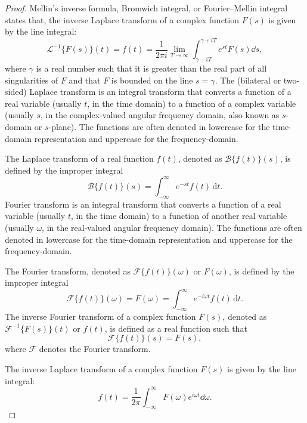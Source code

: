 \documentclass[a4paper,12pt]{report}
\begin{document}
\begin{proof}
Mellin's inverse formula, Bromwich integral, or Fourier–Mellin integral states that, the inverse Laplace transform of a complex function $F(s)$ is given by the line integral:
\[\mathcal{L}^{-1}\{F(s)\}(t)=f(t)=\frac{1}{2\pi i}\lim_{T\to\infty}\int_{\gamma-iT}^{\gamma+iT}e^{st}F(s)\dd{s},\]
where $\gamma$ is a real number such that it is greater than the real part of all singularities of $F$ and that $F$ is bounded on the line $s=\gamma$.
The (bilateral or two-sided) Laplace transform is an integral transform that converts a function of a real variable (usually $t$, in the time domain) to a function of a complex variable (usually $s$, in the complex-valued angular frequency domain, also known as $s$-domain or $s$-plane). The functions are often denoted in lowercase for the time-domain representation and uppercase for the frequency-domain.

The Laplace transform of a real function $f(t)$, denoted as $\mathcal{B}\{f(t)\}(s)$, is defined by the improper integral
\[\mathcal{B}\{f(t)\}(s) = \int_{-\infty}^{\infty} e^{-st} f(t)\,\mathrm{d}t.\]
Fourier transform is an integral transform that converts a function of a real variable (usually $t$, in the time domain) to a function of another real variable (usually $\omega$, in the real-valued angular frequency domain). The functions are often denoted in lowercase for the time-domain representation and uppercase for the frequency-domain.

The Fourier transform, denoted as $\mathcal{F}\{f(t)\}(\omega)$ or $F(\omega)$, is defined by the improper integral
\[\mathcal{F}\{f(t)\}(\omega) = F(\omega) = \int_{-\infty}^{\infty} e^{-i\omega t} f(t)\,\mathrm{d}t.\]
The inverse Fourier transform of a complex function $F(s)$, denoted as $\mathcal{F}^{-1}\{F(s)\}(t)$ or $f(t)$, is defined as a real function such that
\[\mathcal{F}\{f(t)\}(s) = F(s),\]
where $\mathcal {F}$ denotes the Fourier transform.

The inverse Laplace transform of a complex function $F(s)$ is given by the line integral:
\[f(t) = \frac{1}{2\pi}\int_{-\infty}^{\infty} F(\omega) e^{i\omega t}\dd{\omega} .\]




\end{proof}
\end{document}
